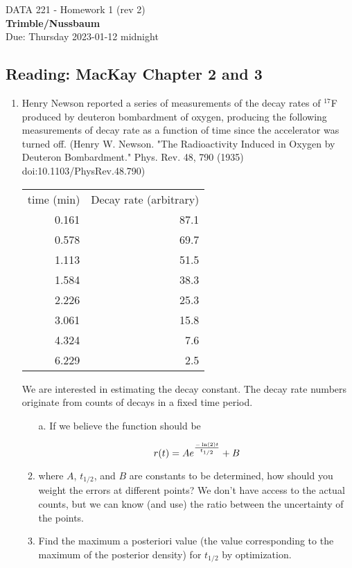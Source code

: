 \documentclass[12pt]{book}
\theoremstyle{definition}
\begin{document}
\begin{center}
{\Large DATA 221 -  Homework 1  (rev 2)   }\\
\textbf{Trimble/Nussbaum}\\ %
Due: Thursday 2023-01-12  midnight
\end{center}

\vspace{0.2 cm}

\subsection*{Reading:  MacKay Chapter 2 and 3}

\begin{enumerate}
\item  Henry Newson reported a series of measurements of the decay rates of $^{17}$F produced by deuteron bombardment of oxygen, producing the following measurements of decay rate as a function of time since the accelerator was turned off. (Henry W. Newson.  "The Radioactivity Induced in Oxygen by Deuteron Bombardment." Phys. Rev. 48, 790 (1935) doi:10.1103/PhysRev.48.790)

\begin{tabular}{rr} \\
time (min) &    Decay rate (arbitrary) \\
0.161 & 87.1 \\
0.578 & 69.7 \\
1.113 & 51.5 \\
1.584 & 38.3 \\
2.226 & 25.3 \\
3.061 & 15.8 \\
4.324 & 7.6 \\
6.229 & 2.5 \\
\end{tabular}

We are interested in estimating the decay constant.  The decay rate numbers originate from counts of decays in a fixed time period.

 \begin{enumerate}[label=\alph*)]
  \item[a.] If we believe the function should be 
 
$$ r(t) = A e ^{ - \ln (2) t \over t_{1/2} } + B $$

  \item  where $A$, $t_{1/2}$, and $B$ are constants to be determined, how should you weight the errors at different points?  We don't have access to the actual counts, but we can know (and use) the ratio between the uncertainty of the points.
  \item  Find the maximum a posteriori value (the value corresponding to the  maximum of the posterior density) for $t_{1/2} $ by optimization.
 \end{enumerate}


\end{enumerate}
\end{document}
